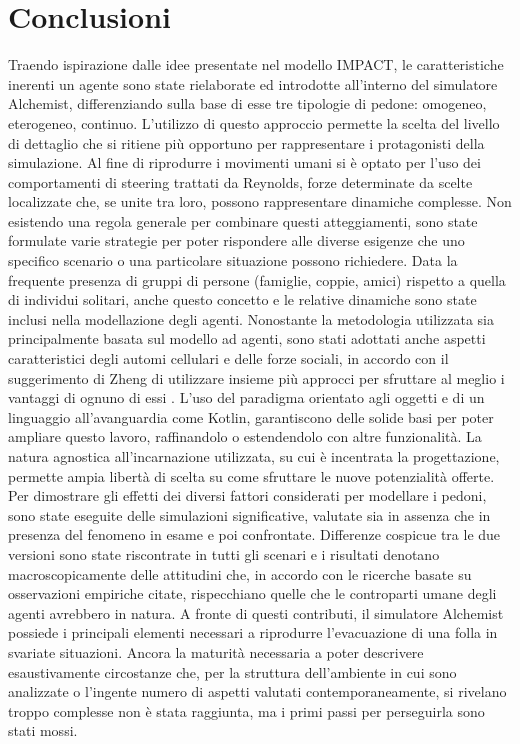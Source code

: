 \section{Conclusioni}
Traendo ispirazione dalle idee presentate nel modello IMPACT, le caratteristiche inerenti un agente sono state rielaborate ed introdotte all'interno del simulatore Alchemist, differenziando sulla base di esse tre tipologie di pedone: omogeneo, eterogeneo, continuo. L'utilizzo di questo approccio permette la scelta del livello di dettaglio che si ritiene più opportuno per rappresentare i protagonisti della simulazione. \newline
Al fine di riprodurre i movimenti umani si è optato per l'uso dei comportamenti di steering trattati da Reynolds, forze determinate da scelte localizzate che, se unite tra loro, possono rappresentare dinamiche complesse. Non esistendo una regola generale per combinare questi atteggiamenti, sono state formulate varie strategie per poter rispondere alle diverse esigenze che uno specifico scenario o una particolare situazione possono richiedere. \newline
Data la frequente presenza di gruppi di persone (famiglie, coppie, amici) rispetto a quella di individui solitari, anche questo concetto e le relative dinamiche sono state inclusi nella modellazione degli agenti. \newline
Nonostante la metodologia utilizzata sia principalmente basata sul modello ad agenti, sono stati adottati anche aspetti caratteristici degli automi cellulari e delle forze sociali, in accordo con il suggerimento di Zheng di utilizzare insieme più approcci per sfruttare al meglio i vantaggi di ognuno di essi \cite{Zheng2009}. \newline
L'uso del paradigma orientato agli oggetti e di un linguaggio all'avanguardia come Kotlin, garantiscono delle solide basi per poter ampliare questo lavoro, raffinandolo o estendendolo con altre funzionalità. La natura agnostica all'incarnazione utilizzata, su cui è incentrata la progettazione, permette ampia libertà di scelta su come sfruttare le nuove potenzialità offerte. \newline
Per dimostrare gli effetti dei diversi fattori considerati per modellare i pedoni, sono state eseguite delle simulazioni significative, valutate sia in assenza che in presenza del fenomeno in esame e poi confrontate. Differenze cospicue tra le due versioni sono state riscontrate in tutti gli scenari e i risultati denotano macroscopicamente delle attitudini che, in accordo con le ricerche basate su osservazioni empiriche citate, rispecchiano quelle che le controparti umane degli agenti avrebbero in natura. \newline
A fronte di questi contributi, il simulatore Alchemist possiede i principali elementi necessari a riprodurre l'evacuazione di una folla in svariate situazioni. Ancora la maturità necessaria a poter descrivere esaustivamente circostanze che, per la struttura dell'ambiente in cui sono analizzate o l'ingente numero di aspetti valutati contemporaneamente, si rivelano troppo complesse non è stata raggiunta, ma i primi passi per perseguirla sono stati mossi.